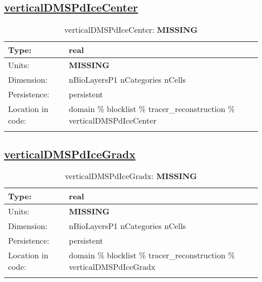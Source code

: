 \subsection[verticalDMSPdIceCenter]{\hyperref[sec:var_tab_tracer_reconstruction]{verticalDMSPdIceCenter}}
\label{subsec:var_sec_tracer_reconstruction_verticalDMSPdIceCenter}
\begin{center}
\begin{longtable}{| p{2.0in} | p{4.0in} |}
        \hline 
        Type: & real \\
        \hline 
        Units: & {\bf \color{red} MISSING} \\
        \hline 
        Dimension: & nBioLayersP1 nCategories nCells \\
        \hline 
        Persistence: & persistent \\
        \hline 
         Location in code: & domain \% blocklist \% tracer\_reconstruction \% verticalDMSPdIceCenter \\
         \hline 
    \caption{verticalDMSPdIceCenter: {\bf \color{red} MISSING}}
\end{longtable}
\end{center}
\subsection[verticalDMSPdIceGradx]{\hyperref[sec:var_tab_tracer_reconstruction]{verticalDMSPdIceGradx}}
\label{subsec:var_sec_tracer_reconstruction_verticalDMSPdIceGradx}
\begin{center}
\begin{longtable}{| p{2.0in} | p{4.0in} |}
        \hline 
        Type: & real \\
        \hline 
        Units: & {\bf \color{red} MISSING} \\
        \hline 
        Dimension: & nBioLayersP1 nCategories nCells \\
        \hline 
        Persistence: & persistent \\
        \hline 
         Location in code: & domain \% blocklist \% tracer\_reconstruction \% verticalDMSPdIceGradx \\
         \hline 
    \caption{verticalDMSPdIceGradx: {\bf \color{red} MISSING}}
\end{longtable}
\end{center}
